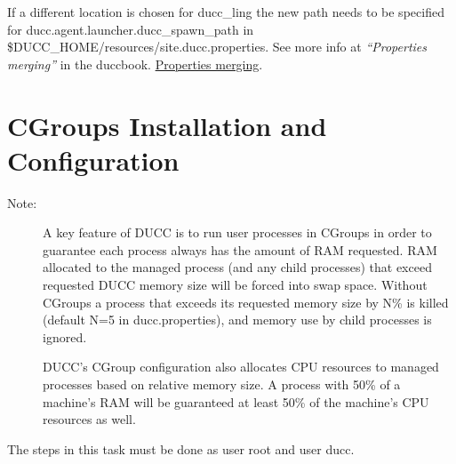 If a different location is chosen for ducc\_ling the new path needs to be specified 
for ducc.agent.launcher.ducc\_spawn\_path in \$DUCC\_HOME/resources/site.ducc.properties.
See more info at
\ifdefined\DUCCSTANDALONE
{\em ``Properties merging''} in the duccbook. 
\else
\hyperref[sec:admin.properties-merge] {Properties merging}. 
\fi


\section{CGroups Installation and Configuration}

\begin{description}
    \item[Note:] A key feature of DUCC is to run user processes in CGroups in order to guarantee
      each process always has the amount of RAM requested. RAM allocated to the managed process
      (and any child processes) that exceed requested DUCC memory size will be forced into swap space. 
      Without CGroups a process that exceeds its requested memory size by N\% is killed 
      (default N=5 in ducc.properties), and memory use by child processes is ignored.
      
      DUCC's CGroup configuration also allocates CPU resources to managed processes based on
      relative memory size. A process with 50\% of a machine's RAM will be guaranteed at least
      50\% of the machine's CPU resources as well. 
\end{description}

    The steps in this task must be done as user root and user ducc.

